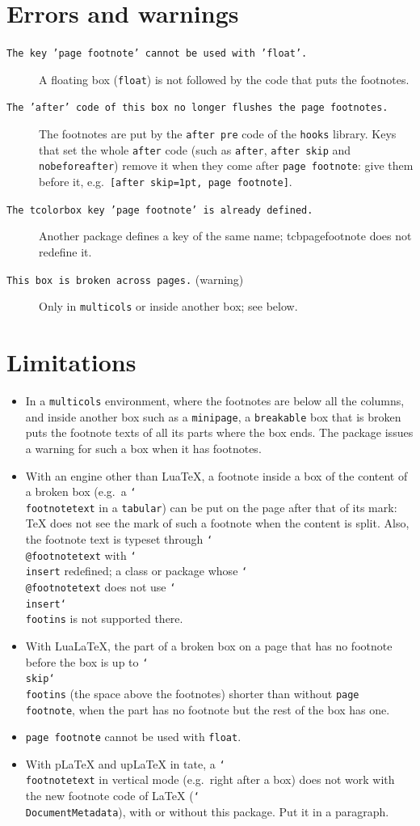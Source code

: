 \documentclass{article}
\newcommand*\cs[1]{\texttt{\char`\\#1}}
\newcommand*\pkg[1]{\textsf{#1}}
\newcommand*\key[1]{\texttt{#1}}
\begin{document}
\section{Errors and warnings}

\begin{description}
\item[\texttt{The key 'page footnote' cannot be used with 'float'.}]
  A floating box (\key{float}) is not followed by the code that puts the
  footnotes.
\item[\texttt{The 'after' code of this box no longer flushes the page
  footnotes.}] The footnotes are put by the \key{after pre} code of the
  \texttt{hooks} library.  Keys that set the whole \texttt{after} code
  (such as \key{after}, \key{after skip} and \key{nobeforeafter}) remove it
  when they come after \key{page footnote}: give them before it, e.g.\
  \verb|[after skip=1pt, page footnote]|.
\item[\texttt{The tcolorbox key 'page footnote' is already defined.}]
  Another package defines a key of the same name; \pkg{tcbpagefootnote}
  does not redefine it.
\item[\texttt{This box is broken across pages.} (warning)] Only in
  \texttt{multicols} or inside another box; see below.
\end{description}

\section{Limitations}
\label{sec:limitations}

\begin{itemize}
\item In a \texttt{multicols} environment, where the footnotes are
  below all the columns, and inside another box such as a
  \texttt{minipage}, a \key{breakable} box that is broken puts the
  footnote texts of all its parts where the box ends.  The package
  issues a warning for such a box when it has footnotes.
\item With an engine other than Lua\TeX, a footnote inside a box of the
  content of a broken box (e.g.\ a \cs{footnotetext} in a
  \texttt{tabular}) can be put on the page after that of its mark:
  \TeX{} does not see the mark of such a footnote when the content is
  split.  Also, the footnote text is typeset through
  \cs{@footnotetext} with \cs{insert} redefined; a class or package
  whose \cs{@footnotetext} does not use \cs{insert}\cs{footins} is not
  supported there.
\item With Lua\LaTeX, the part of a broken box on a page that has no
  footnote before the box is up to \cs{skip}\cs{footins} (the
  space above the footnotes) shorter than without \key{page footnote},
  when the part has no footnote but the rest of the box has one.
\item \key{page footnote} cannot be used with \key{float}.
\item With p\LaTeX{} and up\LaTeX{} in tate, a \cs{footnotetext} in
  vertical mode (e.g.\ right after a box) does not work with the new
  footnote code of \LaTeX{} (\cs{DocumentMetadata}), with or without
  this package.  Put it in a paragraph.
\end{itemize}
\end{document}
